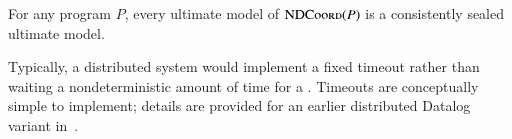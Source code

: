 \begin{theorem}
For any program $P$, every ultimate model of \linebreak $\textsc{NDCoord}(P)$ is a consistently sealed ultimate model.
\end{theorem}

Typically, a distributed system would implement a fixed timeout rather than waiting a nondeterministic amount of time for a .  Timeouts are conceptually simple to implement; details are provided for an earlier distributed Datalog variant in~\cite{boom}.

%
%
